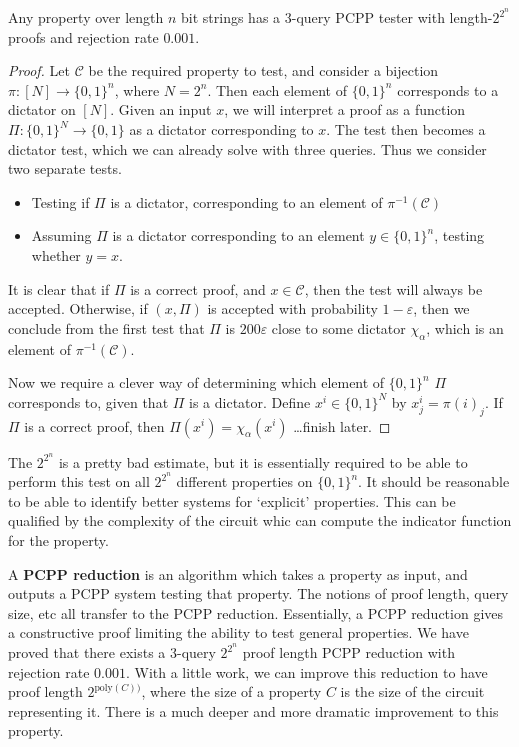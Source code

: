 \begin{theorem}
    Any property over length $n$ bit strings has a 3-query PCPP tester with length-$2^{2^n}$ proofs and rejection rate $0.001$.
\end{theorem}
\begin{proof}
    Let $\mathcal{C}$ be the required property to test, and consider a bijection $\pi: [N] \to \{ 0, 1 \}^n$, where $N = 2^n$. Then each element of $\{ 0, 1 \}^n$ corresponds to a dictator on $[N]$. Given an input $x$, we will interpret a proof as a function $\Pi: \{ 0, 1 \}^N \to \{ 0, 1 \}$ as a dictator corresponding to $x$. The test then becomes a dictator test, which we can already solve with three queries. Thus we consider two separate tests.
    \begin{itemize}
        \item Testing if $\Pi$ is a dictator, corresponding to an element of $\pi^{-1}(\mathcal{C})$
        \item Assuming $\Pi$ is a dictator corresponding to an element $y \in \{ 0, 1 \}^n$, testing whether $y = x$.
    \end{itemize}
    It is clear that if $\Pi$ is a correct proof, and $x \in \mathcal{C}$, then the test will always be accepted. Otherwise, if $(x,\Pi)$ is accepted with probability $1 - \varepsilon$, then we conclude from the first test that $\Pi$ is $200 \varepsilon$ close to some dictator $\chi_\alpha$, which is an element of $\pi^{-1}(\mathcal{C})$.

    Now we require a clever way of determining which element of $\{ 0, 1 \}^n$ $\Pi$ corresponds to, given that $\Pi$ is a dictator. Define $x^i \in \{ 0,1\}^N$ by $x^i_j = \pi(i)_j$. If $\Pi$ is a correct proof, then $\Pi(x^i) = \chi_\alpha(x^i)$ \dots finish later.
\end{proof}

The $2^{2^n}$ is a pretty bad estimate, but it is essentially required to be able to perform this test on all $2^{2^n}$ different properties on $\{ 0, 1 \}^n$. It should be reasonable to be able to identify better systems for `explicit' properties. This can be qualified by the complexity of the circuit whic can compute the indicator function for the property.

A {\bf PCPP reduction} is an algorithm which takes a property as input, and outputs a PCPP system testing that property. The notions of proof length, query size, etc all transfer to the PCPP reduction. Essentially, a PCPP reduction gives a constructive proof limiting the ability to test general properties. We have proved that there exists a 3-query $2^{2^n}$ proof length PCPP reduction with rejection rate $0.001$. With a little work, we can improve this reduction to have proof length $2^{\text{poly}(C))}$, where the size of a property $C$ is the size of the circuit representing it. There is a much deeper and more dramatic improvement to this property.

